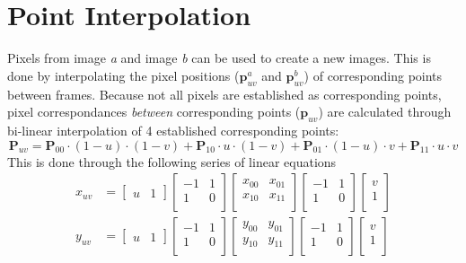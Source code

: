 \documentclass[12pt]{report}
\begin{document}
\chapter{Point Interpolation}
\par
Pixels from image \textit{a} and image \textit{b} can be used to create a new images. This is done by interpolating the pixel positions ($\mathbf{p}^{a}_{uv}$ and $\mathbf{p}^{b}_{uv}$) of corresponding points between frames. Because not all pixels are established as corresponding points, pixel correspondances \textit{between} corresponding points ($\mathbf{p}_{uv}$) are calculated through bi-linear interpolation of 4 established corresponding points: 
\begin{equation*}
\mathbf{P}_{uv} = 
\mathbf{P}_{00}\cdot (1-u)\cdot (1-v)+\mathbf{P}_{10}\cdot u \cdot (1-v)+
\mathbf{P}_{01}\cdot (1-u)\cdot v +\mathbf{P}_{11}\cdot u \cdot v
\end{equation*}
This is done through the following series of linear equations
\begin{equation*}\begin{split}
x_{uv} &= 
\begin{bmatrix}u & 1\end{bmatrix}
\begin{bmatrix}-1 & 1\\ 1 & 0\\\end{bmatrix}
\begin{bmatrix}x_{00} & x_{01} \\ x_{10} & x_{11}\\\end{bmatrix}
\begin{bmatrix}-1 & 1\\ 1 & 0\\\end{bmatrix}
\begin{bmatrix}v \\ 1\\\end{bmatrix}\\
y_{uv} &= 
\begin{bmatrix}u & 1\end{bmatrix}
\begin{bmatrix}-1 & 1\\ 1 & 0\\\end{bmatrix}
\begin{bmatrix}y_{00} & y_{01} \\ y_{10} & y_{11}\\\end{bmatrix}
\begin{bmatrix}-1 & 1\\ 1 & 0\\\end{bmatrix}
\begin{bmatrix}v \\ 1\\\end{bmatrix}\\
\end{split}\end{equation*}
\end{document}
